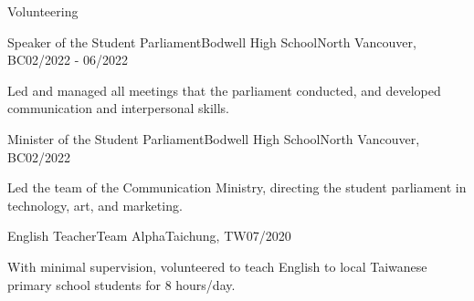 \documentclass{article}
\newlength{\tabin}
\newlength{\secsep}
\newcommand{\lineunder}{\vspace*{-8pt} \\ \hspace*{-6pt} \hrulefill \\ \vspace*{-15pt}}
\newenvironment{tabbedsection}[1]{
  \begin{list}{}{
      \setlength{\itemsep}{0pt}
      \setlength{\labelsep}{0pt}
      \setlength{\labelwidth}{0pt}
      \setlength{\leftmargin}{\tabin}
      \setlength{\rightmargin}{\tabin}
      \setlength{\listparindent}{0pt}
      \setlength{\parsep}{0pt}
      \setlength{\parskip}{0pt}
      \setlength{\partopsep}{0pt}
      \setlength{\topsep}{#1}
    }
  \item[]
}{\end{list}}
\newenvironment{resume_section}[1]{
  \filbreak
  \vspace{2\secsep}
  \textsc{\large#1}
  \lineunder
  \begin{tabbedsection}{\secsep}
}{\end{tabbedsection}}
\newenvironment{subitems}{
  \renewcommand{\labelitemi}{-}
  \begin{itemize}
      \setlength{\labelsep}{1em}
}{\end{itemize}}
\newenvironment{resume_employer}[4]{
  \vspace{\secsep}
  \textbf{#1} {\footnotesize #3} \hfill {\footnotesize#4} \hspace{-1em} \\
  \small{#2}  
  \vspace{\secsep}
  \begin{tabbedsection}{0pt}
  \begin{subitems}
}{\end{subitems}\end{tabbedsection}}
\begin{document}
\begin{resume_section}{Volunteering}
  \begin{resume_employer}{Speaker of the Student Parliament}{Bodwell High School}{North Vancouver, BC}{02/2022 - 06/2022}
    \item Led and managed all meetings that the parliament conducted, and developed communication and interpersonal skills. 
  \end{resume_employer}

  \begin{resume_employer}{Minister of the Student Parliament}{Bodwell High School}{North Vancouver, BC}{02/2022}
    \item Led the team of the Communication Ministry, directing the student parliament in technology, art, and marketing.
  \end{resume_employer}

  \begin{resume_employer}{English Teacher}{Team Alpha}{Taichung, TW}{07/2020}
    \item  With minimal supervision, volunteered to teach English to local Taiwanese primary school students for 8 hours/day.
  \end{resume_employer}

\end{resume_section}
  
\end{document}
